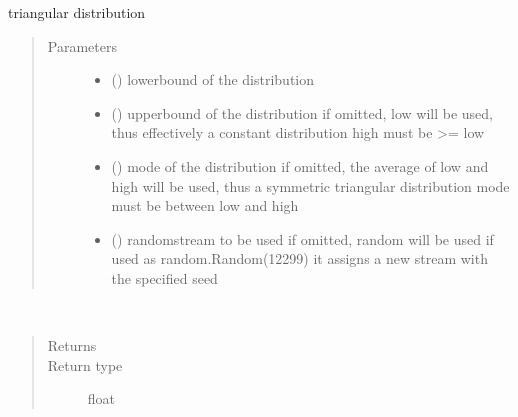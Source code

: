 \documentclass[letterpaper,10pt,english]{sphinxmanual}
\begin{document}
\begin{fulllineitems}
\label{\detokenize{Reference:salabim.Triangular}}
triangular distribution
\begin{quote}\begin{description}
\item[{Parameters}] \leavevmode\begin{itemize}
\item {} 
 () \textendash{} lowerbound of the distribution

\item {} 
 () \textendash{} upperbound of the distribution 
if omitted, low will be used, thus effectively a constant distribution 
high must be \textgreater{}= low

\item {} 
 () \textendash{} mode of the distribution 
if omitted, the average of low and high will be used, thus a symmetric triangular distribution 
mode must be between low and high

\item {} 
 () \textendash{} randomstream to be used 
if omitted, random will be used 
if used as random.Random(12299)
it assigns a new stream with the specified seed

\end{itemize}

\end{description}\end{quote}

\begin{fulllineitems}
\label{\detokenize{Reference:salabim.Triangular.mean}}~\begin{quote}\begin{description}
\item[{Returns}] \leavevmode
{}

\item[{Return type}] \leavevmode
float

\end{description}\end{quote}


\end{fulllineitems}
\end{fulllineitems}
\end{document}
